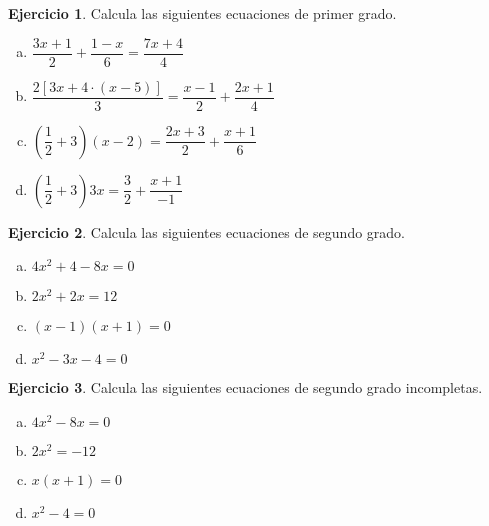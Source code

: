 \documentclass[11pt, oneside]{book}
\theoremstyle{definition} %
\newtheorem{ejercicio}{Ejercicio}
\begin{document}
\begin{ejercicio} Calcula las siguientes ecuaciones de primer grado.
\begin{multicols}{2}
\begin{enumerate}[a)]
    \item $\dfrac{3x+1}{2}+\dfrac{1-x}{6}= \dfrac{7x+4}{4}$
    \item $\dfrac{2[3x+4\cdot(x-5)]}{3}=\dfrac{x-1}{2}+\dfrac{2x+1}{4}$
    \item $\left(\dfrac{1}{2}+3\right)(x-2)=\dfrac{2x+3}{2}+\dfrac{x+1}{6}$
    \item $\left(\dfrac{1}{2}+3\right)3x=\dfrac{3}{2}+\dfrac{x+1}{-1}$
\end{enumerate}
\end{multicols}
\end{ejercicio}

\begin{ejercicio} Calcula las siguientes ecuaciones de segundo grado.
\begin{multicols}{2}
\begin{enumerate}[a)]
    \item $4x^2+4-8x=0$
    \item $2x^2+2x=12$
    \item $(x-1)(x+1)=0$
    \item $x^2-3x-4=0$
\end{enumerate}
\end{multicols}
\end{ejercicio}

\begin{ejercicio} Calcula las siguientes ecuaciones de segundo grado incompletas.
\begin{multicols}{2}
\begin{enumerate}[a)]
    \item $4x^2-8x=0$
    \item $2x^2=-12$
    \item $x(x+1)=0$
    \item $x^2-4=0$
\end{enumerate}
\end{multicols}
\end{ejercicio}
\end{document}

